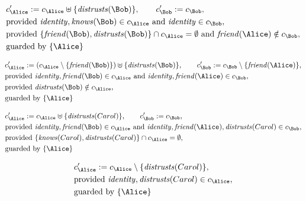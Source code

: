 \begin{align*}
&
c'_
{
\Alice
}
 := 
c_
{
\Alice
}
 \uplus 
\{
\mathit{
distrusts
}
(
\Bob
)
\}
, \qquad 
c'_
{
\Bob
}
 := 
c_
{
\Bob
}
,\\
&
\text{provided } 
\mathit{
identity
}
,
\mathit{
knows
}
(
\Bob
)
 \in c_
{
\Alice
}
 \text{ and } 
\mathit{
identity
}
 \in c_
{
\Bob
}
,\\
&
\text{provided } 
\{
\mathit{
friend
}
(
\Bob
)
,
\mathit{
distrusts
}
(
\Bob
)
\}
 \cap c_
{
\Alice
}
 = \emptyset
 \text{ and } 
\mathit{
friend
}
(
\Alice
)
 \notin c_
{
\Bob
}
,\\
&
\text{guarded by } \{
\Alice
\}
\end{align*}

\begin{align*}
&
c'_
{
\Alice
}
 := 
(c_
{
\Alice
}
 \setminus 
\{
\mathit{
friend
}
(
\Bob
)
\}
) \uplus 
\{
\mathit{
distrusts
}
(
\Bob
)
\}
, \qquad 
c'_
{
\Bob
}
 := 
c_
{
\Bob
}
 \setminus 
\{
\mathit{
friend
}
(
\Alice
)
\}
,\\
&
\text{provided } 
\mathit{
identity
}
,
\mathit{
friend
}
(
\Bob
)
 \in c_
{
\Alice
}
 \text{ and } 
\mathit{
identity
}
,
\mathit{
friend
}
(
\Alice
)
 \in c_
{
\Bob
}
,\\
&
\text{provided } 
\mathit{
distrusts
}
(
\Bob
)
 \notin c_
{
\Alice
}
,\\
&
\text{guarded by } \{
\Alice
\}
\end{align*}

\begin{align*}
&
c'_
{
\Alice
}
 := 
c_
{
\Alice
}
 \uplus 
\{
\mathit{
distrusts
}
(
Carol
)
\}
, \qquad 
c'_
{
\Bob
}
 := 
c_
{
\Bob
}
,\\
&
\text{provided } 
\mathit{
identity
}
,
\mathit{
friend
}
(
\Bob
)
 \in c_
{
\Alice
}
 \text{ and } 
\mathit{
identity
}
,
\mathit{
friend
}
(
\Alice
)
,
\mathit{
distrusts
}
(
Carol
)
 \in c_
{
\Bob
}
,\\
&
\text{provided } 
\{
\mathit{
knows
}
(
Carol
)
,
\mathit{
distrusts
}
(
Carol
)
\}
 \cap c_
{
\Alice
}
 = \emptyset
,\\
&
\text{guarded by } \{
\Alice
\}
\end{align*}

\begin{align*}
&
c'_
{
\Alice
}
 := 
c_
{
\Alice
}
 \setminus 
\{
\mathit{
distrusts
}
(
Carol
)
\}
,\\
&
\text{provided } 
\mathit{
identity
}
,
\mathit{
distrusts
}
(
Carol
)
 \in c_
{
\Alice
}
,\\
&
\text{guarded by } \{
\Alice
\}
\end{align*}
